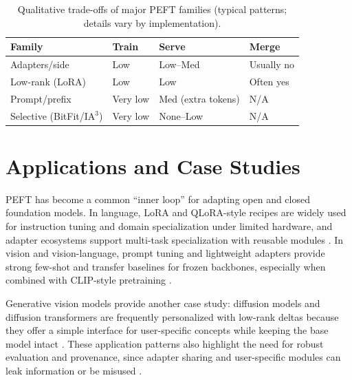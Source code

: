 \documentclass[conference]{IEEEtran}
\begin{document}
\begin{table}[t]
\centering
\caption{Qualitative trade-offs of major PEFT families (typical patterns; details vary by implementation).}
\label{tab:peft-tradeoffs}
\scriptsize
\setlength{\tabcolsep}{3pt}
\begin{tabular}{p{1.75cm}p{1.15cm}p{1.45cm}p{1.05cm}}
\toprule
\textbf{Family} & \textbf{Train} & \textbf{Serve} & \textbf{Merge} \\
\midrule
Adapters/side & Low & Low--Med & Usually no \\
Low-rank (LoRA) & Low & Low & Often yes \\
Prompt/prefix & Very low & Med (extra tokens) & N/A \\
Selective (BitFit/IA$^3$) & Very low & None--Low & N/A \\
\bottomrule
\end{tabular}
\end{table}

\section{Applications and Case Studies}
PEFT has become a common ``inner loop'' for adapting open and closed foundation models. In language, LoRA and QLoRA-style recipes are widely used for instruction tuning and domain specialization under limited hardware, and adapter ecosystems support multi-task specialization with reusable modules \cite{hu2021lora,dettmers2023qlora,pfeiffer2020adapterhub}. In vision and vision-language, prompt tuning and lightweight adapters provide strong few-shot and transfer baselines for frozen backbones, especially when combined with CLIP-style pretraining \cite{jia2022visual,zhang2021tip,radford2021learning,chen2022adaptformer}.

Generative vision models provide another case study: diffusion models and diffusion transformers are frequently personalized with low-rank deltas because they offer a simple interface for user-specific concepts while keeping the base model intact \cite{ho2020denoising,rombach2021high,huang2024in}. These application patterns also highlight the need for robust evaluation and provenance, since adapter sharing and user-specific modules can leak information or be misused \cite{wang2025stolenlora,taraghi2025efficiency}.
\end{document}
